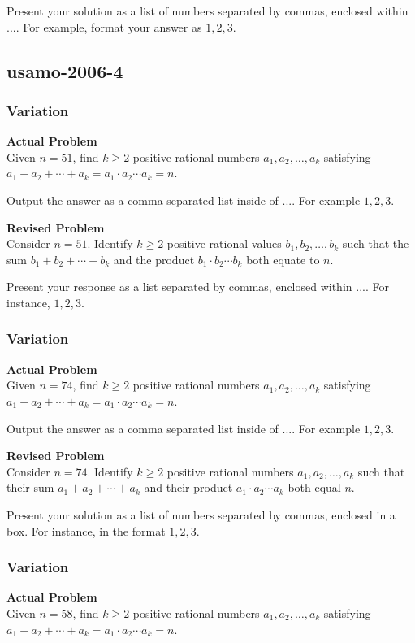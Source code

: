 Present your solution as a list of numbers separated by commas, enclosed within $\boxed{...}$. For example, format your answer as $\boxed{1, 2, 3}$.

\subsection{usamo-2006-4}
\subsubsection{Variation}
\textbf{Actual Problem}\\
Given $n = 51$, find $k\ge 2$ positive rational numbers $a_1, a_2, \ldots, a_k$ satisfying $a_1 + a_2 + \cdots + a_k = a_1\cdot a_2\cdots a_k = n$.

Output the answer as a comma separated list inside of $\boxed{...}$. For example $\boxed{1, 2, 3}$.

\textbf{Revised Problem}\\
Consider $n = 51$. Identify $k\ge 2$ positive rational values $b_1, b_2, \ldots, b_k$ such that the sum $b_1 + b_2 + \cdots + b_k$ and the product $b_1 \cdot b_2 \cdots b_k$ both equate to $n$.

Present your response as a list separated by commas, enclosed within $\boxed{...}$. For instance, $\boxed{1, 2, 3}$.

\subsubsection{Variation}
\textbf{Actual Problem}\\
Given $n = 74$, find $k\ge 2$ positive rational numbers $a_1, a_2, \ldots, a_k$ satisfying $a_1 + a_2 + \cdots + a_k = a_1\cdot a_2\cdots a_k = n$.

Output the answer as a comma separated list inside of $\boxed{...}$. For example $\boxed{1, 2, 3}$.

\textbf{Revised Problem}\\
Consider \( n = 74 \). Identify \( k \ge 2 \) positive rational numbers \( a_1, a_2, \ldots, a_k \) such that their sum \( a_1 + a_2 + \cdots + a_k \) and their product \( a_1 \cdot a_2 \cdots a_k \) both equal \( n \).

Present your solution as a list of numbers separated by commas, enclosed in a box. For instance, in the format \(\boxed{1, 2, 3}\).

\subsubsection{Variation}
\textbf{Actual Problem}\\
Given $n = 58$, find $k\ge 2$ positive rational numbers $a_1, a_2, \ldots, a_k$ satisfying $a_1 + a_2 + \cdots + a_k = a_1\cdot a_2\cdots a_k = n$.


